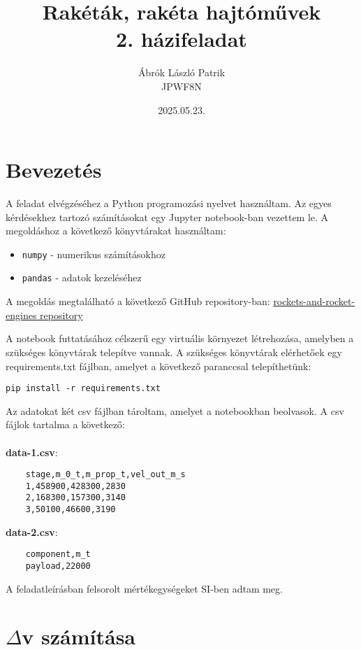 \documentclass[a4paper,12pt]{article}
\title{Rakéták, rakéta hajtóművek\\ 2. házifeladat}
\author{Ábrók László Patrik\\ JPWF8N}
\date{2025.05.23.} %
\begin{document}
\maketitle
\newpage



\section{Bevezetés}
A feladat elvégzéséhez a Python programozási nyelvet használtam. Az egyes kérdésekhez tartozó számításokat egy Jupyter notebook-ban vezettem le.
A megoldáshoz a következő könyvtárakat használtam:
\begin{itemize}
    \item \texttt{numpy} - numerikus számításokhoz
    \item \texttt{pandas} - adatok kezeléséhez
\end{itemize}
A megoldás megtalálható a következő GitHub repository-ban:
\href{https://github.com/LaszloAbrok/rockets-and-rocket-engines}{rockets-and-rocket-engines repository}

A notebook futtatásához célszerű egy virtuális környezet létrehozása, amelyben a szükséges könyvtárak telepítve vannak.
A szükséges könyvtárak elérhetőek egy requirements.txt fájlban, amelyet a következő paranccsal telepíthetünk:
\begin{verbatim}
pip install -r requirements.txt
\end{verbatim}

Az adatokat két csv fájlban tároltam, amelyet a notebookban beolvasok. A csv fájlok tartalma a következő:
\\
\\
\textbf{data-1.csv}:
\begin{verbatim}
    stage,m_0_t,m_prop_t,vel_out_m_s
    1,458900,428300,2830
    2,168300,157300,3140
    3,50100,46600,3190
\end{verbatim}
\textbf{data-2.csv}:
\begin{verbatim}
    component,m_t
    payload,22000
\end{verbatim}

A feladatleírásban felsorolt mértékegységeket SI-ben adtam meg.

\section{$\Delta$v számítása}
\end{document}
